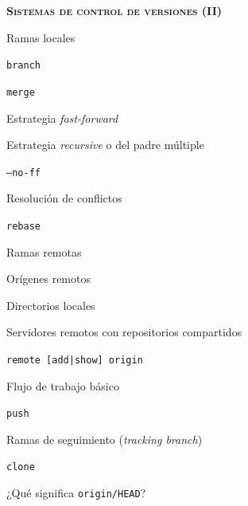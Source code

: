 \begin{longenum}
\begin{longenum}
    \end{longenum}
    \item \textbf{\textsc{Sistemas de control de versiones (II)}} \ \ \ \ \ \
    \begin{longenum}
        \item Ramas locales
        \begin{longenum}
            \item \texttt{branch}
            \item \texttt{merge}
            \begin{longenum}
                \item Estrategia \textit{fast-forward}
                \item Estrategia \textit{recursive} o del padre múltiple
                \item \texttt{--no-ff}
            \end{longenum}
            \item Resolución de conflictos
            \item \texttt{rebase}
        \end{longenum}
        \item Ramas remotas
        \begin{longenum}
            \item Orígenes remotos
            \begin{longenum}
                \item Directorios locales 
                \item Servidores remotos con repositorios compartidos
                \item \texttt{remote [add|show] origin}
            \end{longenum}
            \item Flujo de trabajo básico
            \begin{longenum}
                \item \texttt{push}
                \begin{longenum}
                    \item Ramas de seguimiento (\textit{tracking branch})
                \end{longenum}
                \item \texttt{clone}
                \begin{longenum}
                    \item ¿Qué significa \texttt{origin/HEAD}?
                \end{longenum}

\end{longenum}
\end{longenum}
\end{longenum}
\end{longenum}
